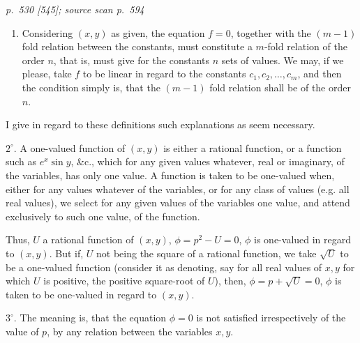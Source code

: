 \documentclass[11pt,a4paper]{article}
\newcommand{\sourcepage}[3]{%
  \bigskip
  \noindent\textit{p.~#1 [#2]; source scan p.~#3}%
  \par\smallskip
}
\begin{document}
\clearpage

\sourcepage{530}{545}{594}
\begin{enumerate}
\item[$9^\circ$.] Considering $(x,y)$ as given, the equation $f=0$, together with the $(m-1)$ fold
relation between the constants, must constitute a $m$-fold relation of the order $n$, that is,
must give for the constants $n$ sets of values. We may, if we please, take $f$ to be
linear in regard to the constants $c_1,c_2,\ldots,c_m$, and then the condition simply is, that
the $(m-1)$ fold relation shall be of the order $n$.
\end{enumerate}

I give in regard to these definitions such explanations as seem necessary.

$2^\circ$. A one-valued function of $(x,y)$ is either a rational function, or a function
such as $e^x\sin y$, \&c., which for any given values whatever, real or imaginary, of the
variables, has only one value. A function is taken to be one-valued when, either for
any values whatever of the variables, or for any class of values (e.g. all real values),
we select for any given values of the variables one value, and attend exclusively to
such one value, of the function.

Thus, $U$ a rational function of $(x,y)$, $\phi=p^2-U=0$, $\phi$ is one-valued in regard to
$(x,y)$. But if, $U$ not being the square of a rational function, we take $\sqrt{U}$ to be
a one-valued function (consider it as denoting, say for all real values of $x,y$ for which
$U$ is positive, the positive square-root of $U$), then, $\phi=p+\sqrt{U}=0$, $\phi$ is taken
to be one-valued in regard to $(x,y)$.

$3^\circ$. The meaning is, that the equation $\phi=0$ is not satisfied irrespectively of the
value of $p$, by any relation between the variables $x,y$.
\end{document}
